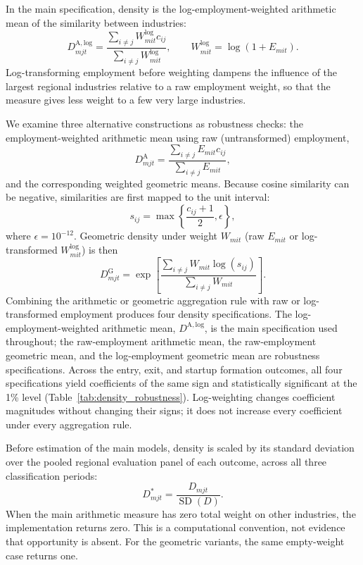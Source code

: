 \documentclass[9pt,twoside]{pnas-new}
\begin{document}
In the main specification, density is the log-employment-weighted arithmetic
mean of the similarity between industries:
\[
D^{\mathrm{A,log}}_{mjt}
 =
 \frac{
   \sum_{i\neq j}W^{\log}_{mit}c_{ij}
 }{
   \sum_{i\neq j}W^{\log}_{mit}
 },
 \qquad
 W^{\log}_{mit}=\log(1+E_{mit}).
\]
Log-transforming employment before weighting dampens the influence of the
largest regional industries relative to a raw employment weight, so that
the measure gives less weight to a few very large industries.

We examine three alternative constructions as robustness checks: the
employment-weighted arithmetic mean using raw (untransformed) employment,
\[
D^{\mathrm{A}}_{mjt}
 =
 \frac{
   \sum_{i\neq j}E_{mit}c_{ij}
 }{
   \sum_{i\neq j}E_{mit}
 },
\]
and the corresponding weighted geometric means. Because cosine similarity can
be negative, similarities are first mapped to the unit interval:
\[
s_{ij}
 =
 \max\left\{
 \frac{c_{ij}+1}{2},\epsilon
 \right\},
\]
where \(\epsilon=10^{-12}\). Geometric density under weight \(W_{mit}\)
(raw \(E_{mit}\) or log-transformed \(W^{\log}_{mit}\)) is then
\[
D^{\mathrm{G}}_{mjt}
 =
 \exp\left[
 \frac{
   \sum_{i\neq j}W_{mit}\log(s_{ij})
 }{
   \sum_{i\neq j}W_{mit}
 }
 \right].
\]
Combining the arithmetic or geometric aggregation rule with raw or
log-transformed employment produces four density specifications. The
log-employment-weighted arithmetic mean, \(D^{\mathrm{A,log}}\), is the main
specification used throughout; the raw-employment arithmetic mean, the
raw-employment geometric mean, and the log-employment geometric mean are
robustness specifications. Across the entry, exit, and startup formation
outcomes, all four specifications yield coefficients of the same sign and
statistically significant at the 1\% level (Table~\ref{tab:density_robustness}). Log-weighting changes coefficient magnitudes without changing their signs; it does not increase every coefficient under every aggregation rule.

Before estimation of the main models, density is scaled by its standard deviation over the pooled
regional evaluation panel of each outcome, across all three classification periods:
\[
D^{*}_{mjt}
 =
 \frac{D_{mjt}}{\operatorname{SD}(D)}.
\]
When the main arithmetic measure has zero total weight on other industries, the implementation returns zero. This is a computational convention, not evidence that opportunity is absent. For the geometric variants, the same empty-weight case returns one.
\end{document}
